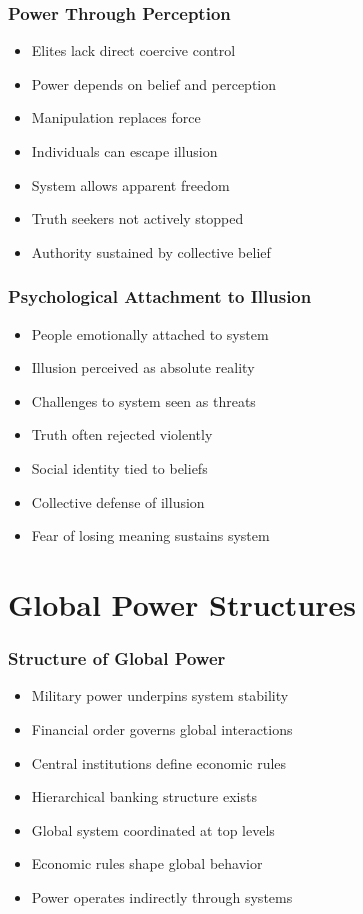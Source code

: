 \begin{frame}[fragile]\frametitle{Power Through Perception}
\begin{itemize}
\item Elites lack direct coercive control
\item Power depends on belief and perception
\item Manipulation replaces force
\item Individuals can escape illusion
\item System allows apparent freedom
\item Truth seekers not actively stopped
\item Authority sustained by collective belief
\end{itemize}
\end{frame}

\begin{frame}[fragile]\frametitle{Psychological Attachment to Illusion}
\begin{itemize}
\item People emotionally attached to system
\item Illusion perceived as absolute reality
\item Challenges to system seen as threats
\item Truth often rejected violently
\item Social identity tied to beliefs
\item Collective defense of illusion
\item Fear of losing meaning sustains system
\end{itemize}
\end{frame}

\section{Global Power Structures}

\begin{frame}[fragile]\frametitle{Structure of Global Power}
\begin{itemize}
\item Military power underpins system stability
\item Financial order governs global interactions
\item Central institutions define economic rules
\item Hierarchical banking structure exists
\item Global system coordinated at top levels
\item Economic rules shape global behavior
\item Power operates indirectly through systems
\end{itemize}
\end{frame}


